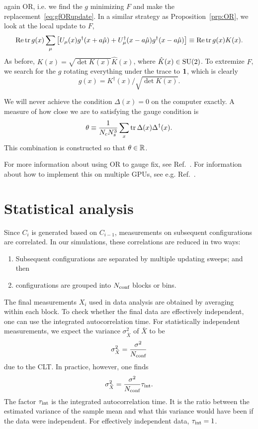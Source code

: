 again OR, i.e. we find the $g$ minimizing $F$ and make the
replacement~\eqref{eq:gfORupdate}. In a similar strategy as
Proposition~\ref{prp:OR}, we look at the local update to $F$,
\begin{equation}
  \mathop{\mathrm{Re}}\tr g(x)\sum_\mu\left[U_\mu(x)g^\dagger(x+a\hat\mu)
                        +U_\mu^\dagger(x-a\hat\mu)g^\dagger(x-a\hat\mu)\right]
  \equiv\mathop{\mathrm{Re}}\tr g(x)K(x).
\end{equation}
As before, $K(x)=\sqrt{\det K(x)}\hat K(x)$, where $\hat K(x)\in\operatorname{SU}(2)$.
To extremize $F$, we search for the $g$ rotating everything under the
trace to ${\mathbf 1}$, which is clearly
\begin{equation}
  g(x)=K^\dagger(x)/\sqrt{\det K(x)}.
\end{equation} 

We will never achieve the condition $\Delta(x)=0$ on the computer exactly.
A measure of how close we are to satisfying the gauge condition is
\begin{equation}
  \theta\equiv\frac{1}{N_c N_s^3}\sum_x\tr\Delta(x)\Delta^\dagger(x).
\end{equation}
This combination is constructed so that $\theta\in\mathbb{R}$. 

For more information
about using OR to gauge fix, see Ref.~\cite{mandula_efficient_1990}. 
For information about how to implement this on multiple GPUs, see
e.g. Ref.~\cite{schrock_coulomb_2013}.

\section{Statistical analysis}\label{sec:statana}

Since $C_i$ is generated based on $C_{i-1}$, measurements on subsequent
configurations are correlated. In our simulations, these
correlations are reduced in two ways:
\begin{enumerate}
  \item Subsequent configurations are separated by multiple updating sweeps;
        and then
  \item configurations are grouped into $N_{\text{conf}}$ blocks or bins.
\end{enumerate}
The final measurements $X_i$ used in data analysis are obtained by averaging
within each block.
To check whether the final data are effectively independent, one can use
the integrated autocorrelation time. 
For statistically independent measurements, we expect the variance 
$\sigma^2_{\bar{X}}$ of $\bar{X}$ to be
\begin{equation}
  \sigma^2_{\bar{X}}=\frac{\sigma^2}{N_{\text{conf}}}
\end{equation}
due to the CLT. In practice, however, one finds 
\begin{equation}
  \sigma^2_{\bar{X}}=\frac{\sigma^2}{N_{\text{conf}}}\tau_\text{int}.
\end{equation}
The factor $\tau_\text{int}$ is the integrated autocorrelation time. It is the 
ratio between the estimated variance of the sample
mean and what this variance would have been if the data were independent.
For effectively independent data, $\tau_\text{int}=1$.

